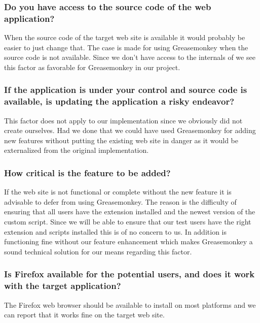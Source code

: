 \subsubsection{Do you have access to the source code of the web application?}

When the source code of the target web site is available it would probably
be easier to just change that. The case is made for using Greasemonkey when
the source code is not available. Since we don't have access to the internals
of \urort{} we see this factor as favorable for Greasemonkey in our project.

\subsubsection{If the application is under your control and source code is
  available, is updating the application a risky endeavor?}

This factor does not apply to our implementation since we obviously did not
create \urort{} ourselves. Had we done that we could have used
Greasemonkey for adding new features without putting the existing web
site in danger as it would be externalized from the original implementation.

\subsubsection{How critical is the feature to be added?}

If the web site is not functional or complete without the new feature
it is advisable to defer from using Greasemonkey. The reason is the
difficulty of ensuring that all users have the extension installed
and the newest version of the custom script. Since we will be able
to ensure that our test users have the right extension and scripts
installed this is of no concern to us. In addition \urort{} is
functioning fine without our feature enhancement which makes
Greasemonkey a sound technical solution for our means regarding this factor.


\subsubsection{Is Firefox available for the potential users, and does it
  work with the target application?}

The Firefox web browser should be available to install on most platforms
and we can report that it works fine on the target web site.

